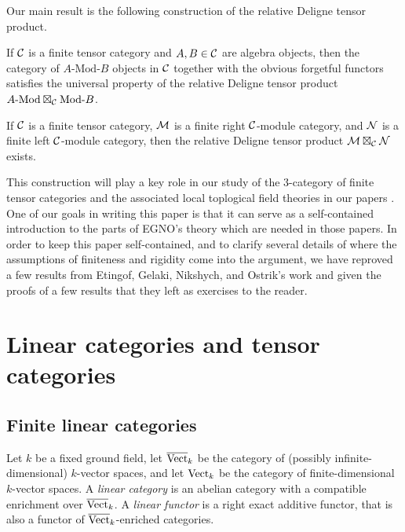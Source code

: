 \documentclass{amsart}
\begin{document}
Our main result is the following construction of the relative Deligne tensor product.

\begin{theorem}
If $\mathcal C$ is a finite tensor category and $A, B \in \mathcal C$ are algebra objects, then the category of $A\text{-Mod-}B$ objects in $\mathcal C$ together with the obvious forgetful functors satisfies the universal property of the relative Deligne tensor product $A\text{-Mod} \boxtimes_\mathcal C \text{Mod-}B$.
\end{theorem}

\begin{corollary}
If $\mathcal C$ is a finite tensor category, $\mathcal M$ is a finite right $\mathcal C$-module category, and $\mathcal N$ is a finite left $\mathcal C$-module category, then the relative Deligne tensor product $\mathcal M \boxtimes_\mathcal C \mathcal N$ exists.
\end{corollary}

This construction will play a key role in our study of the $3$-category of finite tensor categories and the associated local toplogical field theories in our papers \cite{3TC, DTCI}.  One of our goals in writing this paper is that it can serve as a self-contained introduction to the parts of EGNO's theory which are needed in those papers.  In order to keep this paper self-contained, and to clarify several details of where the assumptions of finiteness and rigidity come into the argument, we have reproved a few results from Etingof, Gelaki, Nikshych, and Ostrik's work and given the proofs of a few results that they left as exercises to the reader.

\section{Linear categories and tensor categories} \label{sec:tc-lincat}

\subsection{Finite linear categories}

	Let $k$ be a fixed ground field, let $\overline{\mathrm{Vect}}_k$ be the category of (possibly infinite-dimensional) $k$-vector spaces, and let $\mathrm{Vect}_k$ be the category of finite-dimensional $k$-vector spaces.   A {\em linear category} is an abelian category with a compatible enrichment over $\overline{\mathrm{Vect}}_k$.  
A {\em linear functor} is a right exact additive functor, that is also a functor of $\overline{\mathrm{Vect}}_k$-enriched categories. 
\end{document}
